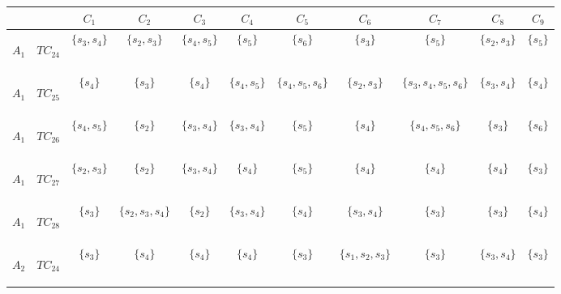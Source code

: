 \begin{table}[htp]
\begin{center}
\begin{tabular}{|cc|c|c|c|c|c|c|c|c|c|}
\hline \hline
& & $C_1$ & $C_2$ & $C_3$ & $C_4$ & $C_5$ & $C_6$ & $C_7$ & $C_8$ & $C_9$\\
\hline \hline
\begin{scriptsize}$A_1$\end{scriptsize} & \begin{scriptsize}$TC_{24}$\end{scriptsize} & $\{s_3, s_4\}$ & $\{s_2, s_3\}$ & $\{s_4, s_5\}$ & $\{s_5\}$ & $\{s_6\}$ & $\{s_3\}$ & $\{s_5\}$ & $\{s_2, s_3\}$ & $\{s_5\}$\\
\begin{scriptsize}$A_1$\end{scriptsize} & \begin{scriptsize}$TC_{25}$\end{scriptsize} & $\{s_4\}$ & $\{s_3\}$ & $\{s_4\}$ & $\{s_4, s_5\}$ & $\{s_4, s_5, s_6\}$ & $\{s_2, s_3\}$ & $\{s_3, s_4, s_5, s_6\}$ & $\{s_3, s_4\}$ & $\{s_4\}$\\
\begin{scriptsize}$A_1$\end{scriptsize} & \begin{scriptsize}$TC_{26}$\end{scriptsize} & $\{s_4, s_5\}$ & $\{s_2\}$ & $\{s_3, s_4\}$ & $\{s_3, s_4\}$ & $\{s_5\}$ & $\{s_4\}$ & $\{s_4, s_5, s_6\}$ & $\{s_3\}$ & $\{s_6\}$\\
\begin{scriptsize}$A_1$\end{scriptsize} & \begin{scriptsize}$TC_{27}$\end{scriptsize} & $\{s_2, s_3\}$ & $\{s_2\}$ & $\{s_3, s_4\}$ & $\{s_4\}$ & $\{s_5\}$ & $\{s_4\}$ & $\{s_4\}$ & $\{s_4\}$ & $\{s_3\}$\\
\begin{scriptsize}$A_1$\end{scriptsize} & \begin{scriptsize}$TC_{28}$\end{scriptsize} & $\{s_3\}$ & $\{s_2, s_3, s_4\}$ & $\{s_2\}$ & $\{s_3, s_4\}$ & $\{s_4\}$ & $\{s_3, s_4\}$ & $\{s_3\}$ & $\{s_3\}$ & $\{s_4\}$\\
\begin{scriptsize}$A_2$\end{scriptsize} & \begin{scriptsize}$TC_{24}$\end{scriptsize} & $\{s_3\}$ & $\{s_4\}$ & $\{s_4\}$ & $\{s_4\}$ & $\{s_3\}$ & $\{s_1, s_2, s_3\}$ & $\{s_3\}$ & $\{s_3, s_4\}$ & $\{s_3\}$\\

\end{tabular}
\end{center}
\end{table}
